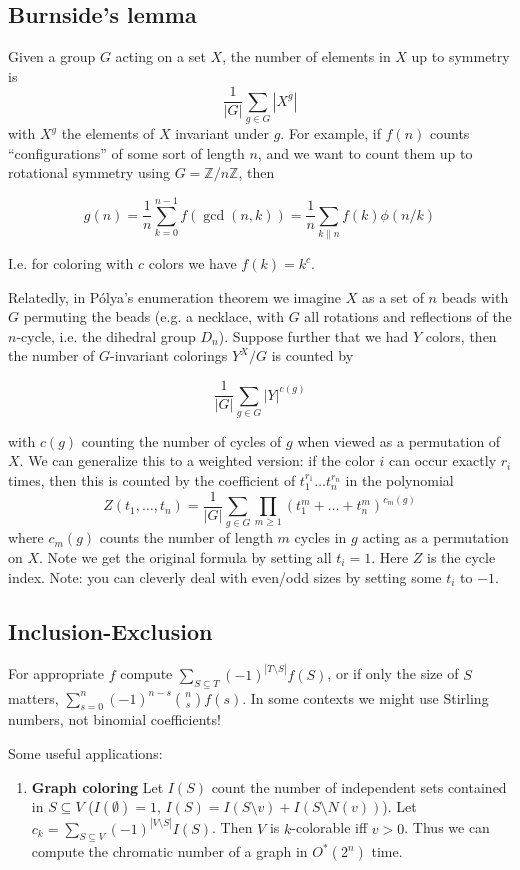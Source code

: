\documentclass[
	a4paper,
	landscape,
	10pt,
	article
]{article}
\begin{document}
\subsection{Burnside's lemma}
Given a group $G$ acting on a set $X$, the number of elements in $X$ up to
symmetry is $$\frac{1}{|G|}\sum_{g\in G} |X^g|$$ with $X^g$ the elements of
$X$ invariant under $g$. For example, if $f(n)$ counts ``configurations''
of some sort of length $n$, and we want to count them up to rotational symmetry
using $G = \mathbb{Z}/n\mathbb{Z}$, then

$$g(n) = \frac{1}{n} \sum_{k=0}^{n-1} f(\gcd(n, k))
	= \frac{1}{n}\sum_{k \| n} f(k) \phi(n / k)$$

I.e. for coloring with $c$ colors we have $f(k) = k^c$.

Relatedly, in P\'olya's enumeration theorem we imagine $X$ as a set of $n$
beads with $G$ permuting the beads (e.g. a necklace, with $G$ all rotations and
reflections of the $n$-cycle, i.e. the dihedral group $D_n$).
Suppose further that we had $Y$ colors, then
the number of $G$-invariant colorings $Y^X / G$ is counted by

$$\frac{1}{|G|}\sum_{g\in G} |Y|^{c(g)}$$

with $c(g)$ counting the number of cycles of $g$ when viewed as a permutation
of $X$. We can generalize this to a weighted version: if the color $i$ can
occur exactly $r_i$ times, then this is counted by the coefficient of
$t_1^{r_1}\dots t_n^{r_n}$ in the polynomial
$$Z(t_1,\dots,t_n) = \frac{1}{|G|}\sum_{g\in G} \prod_{m\geq 1}
	(t_1^m+\dots+t_n^m)^{c_m(g)}$$
where $c_m(g)$ counts the number of length $m$ cycles in $g$ acting as a
permutation on $X$. Note we get the original formula by setting all $t_i=1$.
Here $Z$ is the cycle index. Note: you can cleverly deal with even/odd sizes
by setting some $t_i$ to $-1$.


\subsection{Inclusion-Exclusion}

For appropriate $f$ compute $\sum_{S\subseteq T} (-1)^{|T\setminus S|} f(S)$,
or if only the size of $S$ matters, $\sum_{s=0}^n (-1)^{n-s} \binom{n}{s}f(s)$.
In some contexts we might use Stirling numbers, not binomial coefficients!

Some useful applications:
\begin{enumerate}
	\item[] \textbf{Graph coloring} Let $I(S)$ count the number
		of independent sets
		contained in $S \subseteq V$ ($I(\emptyset) = 1$,
		$I(S) = I(S\setminus v) + I(S\setminus N(v))$). Let
		$c_k = \sum_{S\subseteq V} (-1)^{|V\setminus S|} I(S)$. Then $V$
		is $k$-colorable iff $v > 0$. Thus we can compute the chromatic
		number of a graph in $O^*(2^n)$ time.
\end{enumerate}
\end{document}
